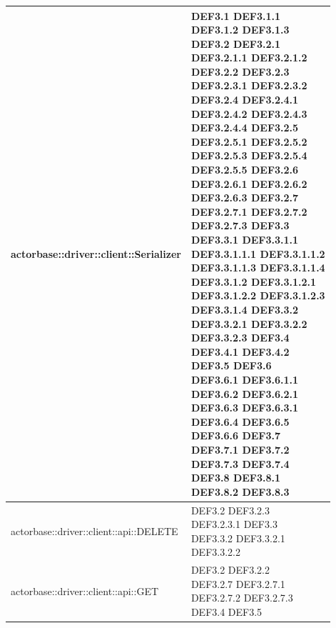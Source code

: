 \documentclass{scalatekids-article}
\begin{document}
\begin{longtable}[H]{|p{12cm}|p{5.5cm}|}
  actorbase::driver::client::Serializer & \multiLineCell[t]{DEF3.1 DEF3.1.1\\DEF3.1.2 DEF3.1.3\\DEF3.2 DEF3.2.1\\DEF3.2.1.1 DEF3.2.1.2\\DEF3.2.2 DEF3.2.3\\DEF3.2.3.1 DEF3.2.3.2\\DEF3.2.4 DEF3.2.4.1\\DEF3.2.4.2 DEF3.2.4.3\\DEF3.2.4.4 DEF3.2.5\\DEF3.2.5.1 DEF3.2.5.2\\DEF3.2.5.3 DEF3.2.5.4\\DEF3.2.5.5 DEF3.2.6\\DEF3.2.6.1 DEF3.2.6.2\\DEF3.2.6.3 DEF3.2.7\\DEF3.2.7.1 DEF3.2.7.2\\DEF3.2.7.3 DEF3.3\\DEF3.3.1 DEF3.3.1.1\\DEF3.3.1.1.1 DEF3.3.1.1.2\\DEF3.3.1.1.3 DEF3.3.1.1.4\\DEF3.3.1.2 DEF3.3.1.2.1\\DEF3.3.1.2.2 DEF3.3.1.2.3\\DEF3.3.1.4 DEF3.3.2\\DEF3.3.2.1 DEF3.3.2.2\\DEF3.3.2.3 DEF3.4\\DEF3.4.1 DEF3.4.2\\DEF3.5 DEF3.6\\DEF3.6.1 DEF3.6.1.1\\DEF3.6.2 DEF3.6.2.1\\DEF3.6.3 DEF3.6.3.1\\DEF3.6.4 DEF3.6.5\\DEF3.6.6 DEF3.7\\DEF3.7.1 DEF3.7.2\\DEF3.7.3 DEF3.7.4\\DEF3.8 DEF3.8.1\\DEF3.8.2 DEF3.8.3\\}\\
  \hline
  actorbase::driver::client::api::DELETE & \multiLineCell[t]{DEF3.2 DEF3.2.3\\DEF3.2.3.1 DEF3.3\\DEF3.3.2 DEF3.3.2.1\\DEF3.3.2.2}\\
  \hline
  actorbase::driver::client::api::GET & \multiLineCell[t]{DEF3.2 DEF3.2.2\\DEF3.2.7 DEF3.2.7.1\\DEF3.2.7.2 DEF3.2.7.3\\DEF3.4 DEF3.5\\}\\

\end{longtable}
\end{document}
